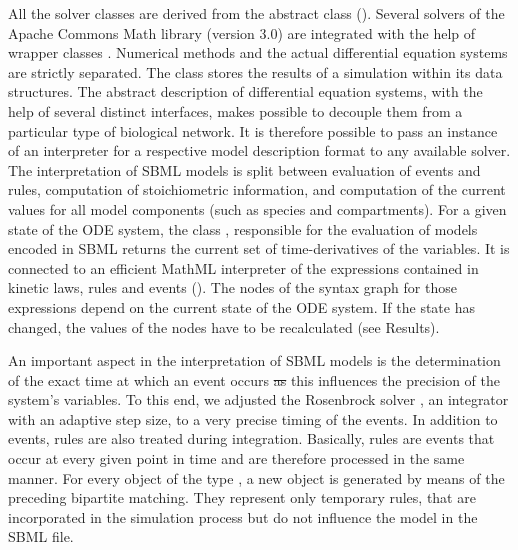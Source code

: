 \documentclass[10pt]{bmc_article}
\newenvironment{bmcformat}{\fussy\setboolean{publ}{true}}{\fussy}
\begin{document}
\begin{bmcformat}
All the solver classes are derived from the abstract class \AbstractDESSolver ().
Several solvers of the Apache Commons Math library (version 3.0) are integrated with the help of wrapper classes .
Numerical methods and the actual differential equation systems are strictly separated.
The class \MultiTable stores the results of a simulation within its \Block data structures. 
%
The abstract description of differential equation systems, with the help of several distinct interfaces, makes  possible to decouple them from a particular type of biological network. It is therefore possible to pass an instance of an interpreter for a respective model description format to any available solver.
%
The interpretation of \acs{SBML} models is split between evaluation of events
and rules, computation of stoichiometric information, and computation of the
current values for all model components (such as species and compartments).
%
For a given state of the \acs{ODE} system, the class \SBMLinterpreter,
responsible for the evaluation of models encoded in \acs{SBML}\COR{,} returns
the current set of time-derivatives of the variables.
It is connected to an efficient MathML interpreter of the expressions contained
in kinetic laws, rules and events (\ASTNodeInterpreter).
The nodes of the syntax graph for those expressions depend on the current state
of the \acs{ODE} system.
If the state has changed, the values of the nodes have to be recalculated (see
Results).

%
An important aspect in the interpretation of \acs{SBML} models is the
determination of the exact time at which an event occurs \sout{as}
this influences the precision of the system's variables.
To this end, we adjusted  the Rosenbrock solver
\cite{Kotcon2011},
an integrator with an adaptive step size, to a very precise timing of the
events.
In addition to events, rules are also treated during integration.
Basically, rules are  events that occur at every given point
in time and are therefore processed in the same manner.
For every object of the type \AlgebraicRule, a new \AssignmentRule object is
generated by means of the preceding bipartite matching.
They represent only temporary rules, that are incorporated in the simulation
process but do not influence the model in the \acs{SBML} file.
%


\end{bmcformat}
\end{document}
